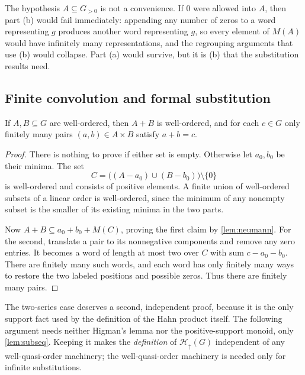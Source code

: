 \documentclass[11pt,letterpaper]{article}
\theoremstyle{definition}
\theoremstyle{remark}
\newenvironment{corollary}{\crefalias{theorem}{corollary}\corollaryx}{\endcorollaryx}
\newcommand{\Hu}[1]{\mathcal H_{\uparrow}(#1)}
\begin{document}
The hypothesis $A\subseteq G_{>0}$ is not a convenience. If $0$ were allowed
into $A$, then part (b) would fail immediately: appending any number of zeros
to a word representing $g$ produces another word representing $g$, so every
element of $M(A)$ would have infinitely many representations, and the
regrouping arguments that use (b) would collapse. Part (a) would survive, but
it is (b) that the substitution results need.

\subsection{Finite convolution and formal substitution}
\begin{corollary}\label{cor:convolution}
If $A,B\subseteq G$ are well-ordered, then $A+B$ is well-ordered, and for each
$c\in G$ only finitely many pairs $(a,b)\in A\times B$ satisfy $a+b=c$.
\end{corollary}
\begin{proof}
There is nothing to prove if either set is empty. Otherwise let $a_0,b_0$
be their minima. The set
\[
 C=\bigl((A-a_0)\cup(B-b_0)\bigr)\setminus\{0\}
\]
is well-ordered and consists of positive elements. A finite union of
well-ordered subsets of a linear order is well-ordered, since the minimum of
any nonempty subset is the smaller of its existing minima in the two parts.

Now $A+B\subseteq a_0+b_0+M(C)$, proving the first claim by
\cref{lem:neumann}. For the second, translate a pair to its nonnegative
components and remove any zero entries. It becomes a word of length at most
two over $C$ with sum $c-a_0-b_0$. There are finitely many such words, and each
word has only finitely many ways to restore the two labeled positions and
possible zeros. Thus there are finitely many pairs.
\end{proof}

The two-series case deserves a second, independent proof, because it is the
only support fact used by the definition of the Hahn product itself. The
following argument needs neither Higman's lemma nor the positive-support
monoid, only \cref{lem:subseq}. Keeping it makes the \emph{definition} of
$\Hu{G}$ independent of any well-quasi-order machinery; the
well-quasi-order machinery is needed only for infinite substitutions.
\end{document}
